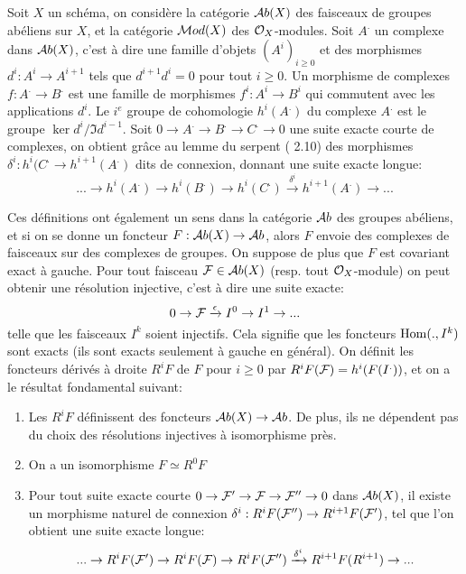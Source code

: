 Soit $X$ un schéma, on considère la catégorie $\mathcal{A} b(X)$ des faisceaux de groupes abéliens sur $X$, et la catégorie $\mathcal{M} od(X)$ des $\mathcal{O}_X$-modules. Soit $A^.$ un complexe dans $\mathcal{A} b(X)$, c'est à dire une famille d'objets $(A^i)_{i\geq 0}$ et des morphismes $d^i:A^i\rightarrow A^{i+1}$ tels que $d^{i+1}d^i=0$ pour tout $i\geq 0$. Un morphisme de complexes $f:A^.\rightarrow B^.$ est une famille de morphismes $f^i:A^i\rightarrow B^i$ qui commutent avec les applications $d^i$. Le $i^e$ groupe de cohomologie $h^i(A^.)$ du complexe $A^.$ est le groupe $\ker d^i/\Im d^{i-1}$. Soit $0\rightarrow A^.\rightarrow B^. \rightarrow C^. \rightarrow 0$ une suite exacte courte de complexes, on obtient grâce au lemme du serpent (\cite{atiyahmacdo} 2.10) des morphismes $\delta ^i:h^i(C^.\rightarrow h^{i+1}(A^.) $ dits de connexion, donnant une suite exacte longue:
\begin{equation}\label{eq:longSES}
...\rightarrow h^i(A^.) \rightarrow h^i(B^.) \rightarrow h^i(C^.) \xrightarrow{\delta ^i} h^{i+1}(A^.) \rightarrow ...
\end{equation}

Ces définitions ont également un sens dans la catégorie $\mathcal{A} b$ des groupes abéliens, et si on se donne un foncteur $F:\mathcal{A} b(X)\rightarrow \mathcal{A} b$, alors $F$ envoie des complexes de faisceaux sur des complexes de groupes. On suppose de plus que $F$ est covariant exact à gauche. Pour tout faisceau $\mathcal{F}\in \mathcal{A} b(X)$ (resp. tout $\mathcal{O}_X$-module) on peut obtenir une résolution injective, c'est à dire une suite exacte:
$$0\rightarrow \mathcal{F} \xrightarrow{\epsilon} I^0\rightarrow I^1\rightarrow ...$$
telle que les faisceaux $I^k$ soient injectifs. Cela signifie que les foncteurs $\operatorname{Hom}(.,I^k)$ sont exacts (ils sont exacts seulement à gauche en général). On définit les foncteurs dérivés à droite $R^iF$ de $F$ pour $i\geq 0$ par $R^i F(\mathcal{F})=h^i(F(I^.))$, et on a le résultat fondamental suivant:

\begin{thm}
\begin{enumerate}
\item Les $R^i F$ définissent des foncteurs $\mathcal{A} b(X)\rightarrow \mathcal{A} b$. De plus, ils ne dépendent pas du choix des résolutions injectives à isomorphisme près.
\item On a un isomorphisme $F\simeq R^0F$
\item Pour tout suite exacte courte $0\rightarrow \mathcal{F}'\rightarrow \mathcal{F} \rightarrow \mathcal{F}'' \rightarrow 0$ dans $\mathcal{A} b(X)$, il existe un morphisme naturel de connexion $\delta^i:R^iF(\mathcal{F}'')\rightarrow R^{i+1}F(\mathcal{F}')$, tel que l'on obtient une suite exacte longue:
$$...\rightarrow R^iF(\mathcal{F}') \rightarrow R^iF(\mathcal{F}) \rightarrow R^iF(\mathcal{F}'') \xrightarrow{\delta ^i} R^{i+1}F(R^{i+1}) \rightarrow ...$$
\end{enumerate}
\end{thm}

